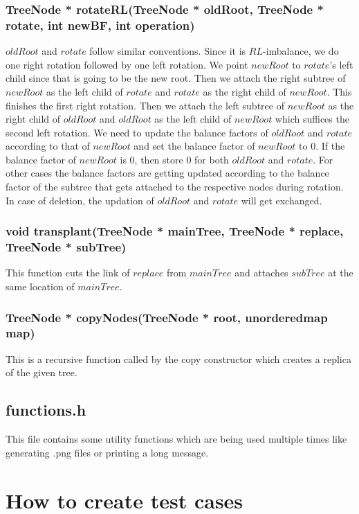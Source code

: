 \documentclass{article}
\begin{document}
\subsubsection{TreeNode * rotateRL(TreeNode * oldRoot, TreeNode * rotate, int newBF, int operation)}
\label{RL}
$oldRoot$ and $rotate$ follow similar conventions. Since it is $RL$-imbalance, we do one right rotation followed by one left rotation. We point $newRoot$ to $rotate$'s left child since that is going to be the new root. Then we attach the right subtree of $newRoot$ as the left child of $rotate$ and $rotate$ as the right child of $newRoot$. This finishes the first right rotation. Then we attach the left subtree of $newRoot$ as the right child of $oldRoot$ and $oldRoot$ as the left child of $newRoot$ which suffices the second left rotation.\newline
We need to update the balance factors of $oldRoot$ and $rotate$ according to that of $newRoot$ and set the balance factor of $newRoot$ to $0$. If the balance factor of $newRoot$ is $0$, then store $0$ for both $oldRoot$ and $rotate$. For other cases the balance factors are getting updated according to the balance factor of the subtree that gets attached to the respective nodes during rotation. In case of deletion, the updation of $oldRoot$ and $rotate$ will get exchanged.

\subsubsection{void transplant(TreeNode * mainTree, TreeNode * replace, TreeNode * subTree)}
\label{tr}
This function cuts the link of $replace$ from $mainTree$ and attaches $subTree$ at the same location of $mainTree$.

\subsubsection{TreeNode * copyNodes(TreeNode * root, unorderedmap map)}
This is a recursive function called by the copy constructor which creates a replica of the given tree.

\subsection{functions.h}
This file contains some utility functions which are being used multiple times like generating .png files or printing a long message.

\section{How to create test cases}
\end{document}
